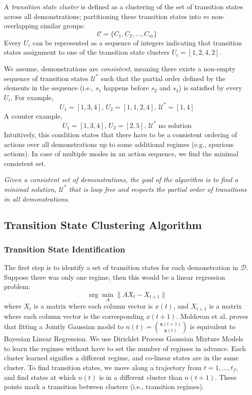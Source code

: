 A \emph{transition state cluster} is
defined as a clustering of the set of transition states across all demonstrations; partitioning these transition states into $m$ non-overlapping similar groups:
\[
\mathcal{C} = \{C_1, C_2,...,C_m\}
\]
Every $U_i$ can be represented as a sequence of integers indicating that transition states assignment to one of the transition state clusters $U_i=[1,2,4,2]$.

We assume, demonstrations are \emph{consistent}, meaning there exists a non-empty sequence of transition states $\mathcal{U}^*$ such that the partial order defined by the elements in the sequence (i.e., $s_1$ happens before $s_2$ and $s_3$) is satisfied by every $U_i$. For example, 
\[U_1 = [1,3,4]\text{, }U_2 = [1,1,2,4]\text{, }\mathcal{U}^*=[1,4] \]
A counter example,
\[U_1 = [1,3,4]\text{, }U_2 = [2,5]\text{, }\mathcal{U}^*\text{  no solution} \]
Intuitively, this condition states that there have to be a consistent ordering of actions over all demonstrations up to some additional regimes (e.g., spurious actions). 
In case of multiple modes in an action sequence, we find the minimal consistent set.


\noindent \emph{Given a consistent set of demonstrations, the goal of the algorithm is to find a minimal solution, $\mathcal{U}^*$ that is loop free and respects the partial order of transitions in all demonstrations.}

\subsection{Transition State Clustering Algorithm}

\subsubsection{Transition State Identification}
The first step is to identify a set of transition states for each demonstration in $\mathcal{D}$.
Suppose there was only one regime, then this would be a linear regression problem:
\[
\arg\min_A \|A X_t - X_{t+1}\|
\]
where $X_t$ is a matrix where each column vector is $x(t)$, and $X_{t+1}$ is a matrix where each column vector is the corresponding $x(t+1)$.
Moldovan et al. \cite{moldovan2013dirichlet} proves that fitting a Jointly Gaussian model to $n(t) = \binom{\mathbf{x}(t+1)}{\mathbf{x}(t)}$ is equivalent to Bayesian Linear Regression.
We use Dirichlet Process Gaussian Mixture Models to learn the regimes without have to set the number of regimes in advance.
Each cluster learned signifies a different regime, and co-linear states are in the same cluster.
To find transition states, we move along a trajectory from $t=1,...,t_f$, and find states at which $n(t)$ is in a different cluster than $n(t+1)$.
These points mark a transition between clusters (i.e., transition regimes).

